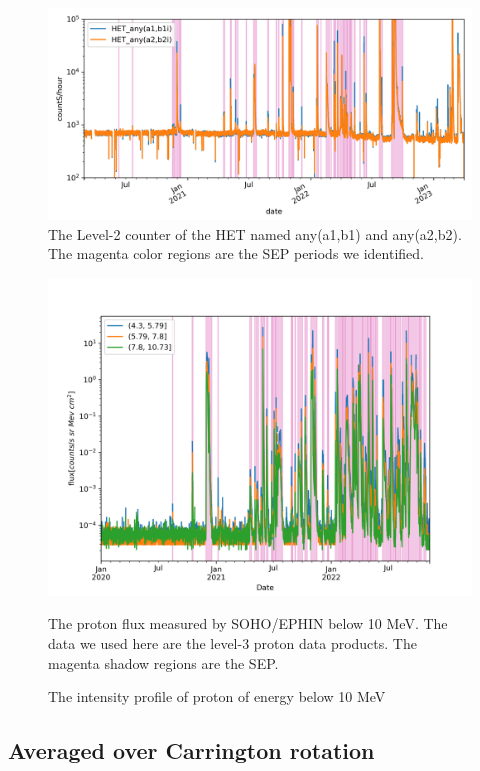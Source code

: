 \begin{figure}
    \centering
    \includegraphics[width = \textwidth]{images/ACR/SOLO-lvl2-trriger.png}
    \caption[The L2 counter of \ac{HET}]{The Level-2 counter of the \ac{HET} named any(a1,b1) and any(a2,b2). The magenta color regions are the SEP periods we identified.}
    \label{Fig:solo-lvl2}
\end{figure}



\begin{figure}
    \centering
    \includegraphics[width = \textwidth]{images/ACR/SOLO-EPHIN-l3i-log2+6-proton-6H.png}
    \caption{The intensity profile of proton of energy below 10 MeV}{The proton flux measured by SOHO/EPHIN below 10 MeV. The data we used here are the level-3 proton data products. The magenta shadow regions are the SEP.}
    \label{Fig:SOHO_EPHIN_Proton_flux}
\end{figure}

\subsection*{Averaged over Carrington rotation}

